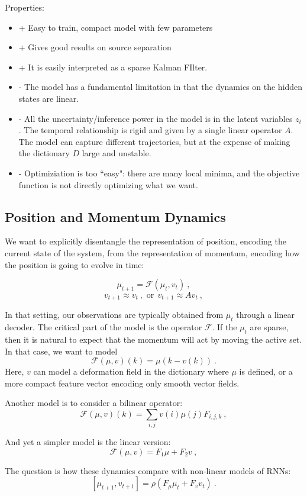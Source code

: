 \documentclass[11pt]{article} %
\begin{document}
Properties:
\begin{itemize}
\item + Easy to train, compact model with few parameters
\item + Gives good results on source separation
\item + It is easily interpreted as a sparse Kalman FIlter.
\item - The model has a fundamental limitation in that the dynamics on the hidden states are linear. 
\item - All the uncertainty/inference power in the model is in the latent variables $z_t$. The temporal relationship is rigid and given by
a single linear operator $A$. The model can capture different trajectories, but at the expense of making the dictionary $D$ large and unstable.
\item - Optimiziation is too ``easy": there are many local minima, and the objective function is not directly optimizing what we want.
\end{itemize}

\subsection{Position and Momentum Dynamics}

We want to explicitly disentangle the representation of position, encoding 
the current state of the system, from the representation of momentum, encoding 
how the position is going to evolve in time:

$$\mu_{t+1} = \mathcal{F}(\mu_t, v_t)~,$$
$$v_{t+1} \approx v_{t}~,\mbox{ or} ~~v_{t+1} \approx A v_{t}~,$$

In that setting, our observations are typically obtained from $\mu_t$ through a linear decoder. 
The critical part of the model is the operator $\mathcal{F}$.
If the $\mu_t$ are sparse, then it is natural to expect that the momentum will act by moving the active set. 
In that case, we want to model 
$$\mathcal{F}(\mu, v)(k)= \mu(k - v(k))~.$$
Here, $v$ can model a deformation field in the dictionary where $\mu$ is defined, or a more compact
feature vector encoding only smooth vector fields.

Another model is to consider a bilinear operator:
$$\mathcal{F}(\mu, v)(k) = \sum_{i,j} v(i) \mu(j) F_{i,j,k}~,$$

And yet a simpler model is the linear version:
$$\mathcal{F}(\mu, v) = F_1 \mu + F_2 v~,$$

The question is how these dynamics compare with non-linear models of RNNs:
$$[\mu_{t+1}, v_{t+1}] = \rho( F_\mu \mu_t + F_v v_t)~.$$
\end{document}

